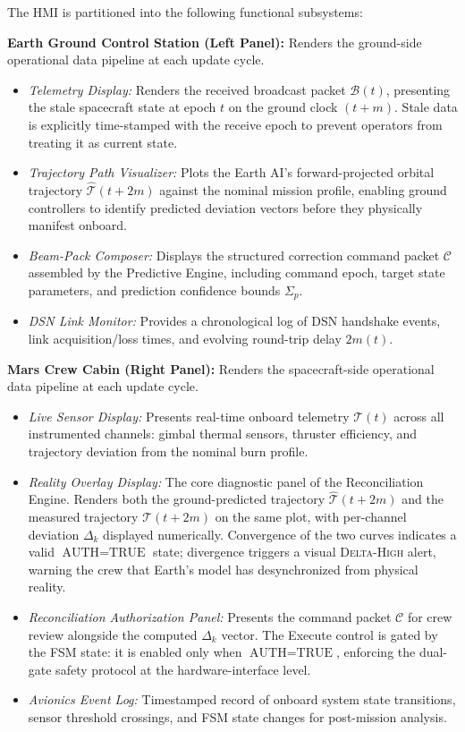 \documentclass[ASNA,twocolumn]{USG}
\begin{document}
The HMI is partitioned into the following functional subsystems:

\textbf{Earth Ground Control Station (Left Panel):} Renders the ground-side operational
data pipeline at each update cycle.
\begin{itemize}
    \item \textit{Telemetry Display:} Renders the received broadcast packet \(\mathcal{B}(t)\),
    presenting the stale spacecraft state at epoch \(t\) on the ground clock \((t+m)\).
    Stale data is explicitly time-stamped with the receive epoch to prevent operators
    from treating it as current state.
    \item \textit{Trajectory Path Visualizer:} Plots the Earth AI's forward-projected
    orbital trajectory \(\hat{\mathcal{T}}(t+2m)\) against the nominal mission profile,
    enabling ground controllers to identify predicted deviation vectors before they
    physically manifest onboard.
    \item \textit{Beam-Pack Composer:} Displays the structured correction command packet
    \(\mathcal{C}\) assembled by the Predictive Engine, including command epoch, target
    state parameters, and prediction confidence bounds \(\Sigma_p\).
    \item \textit{DSN Link Monitor:} Provides a chronological log of DSN handshake events,
    link acquisition/loss times, and evolving round-trip delay \(2m(t)\).
\end{itemize}

\textbf{Mars Crew Cabin (Right Panel):} Renders the spacecraft-side operational data pipeline
at each update cycle.
\begin{itemize}
    \item \textit{Live Sensor Display:} Presents real-time onboard telemetry \(\mathcal{T}(t)\)
    across all instrumented channels: gimbal thermal sensors, thruster efficiency, and
    trajectory deviation from the nominal burn profile.
    \item \textit{Reality Overlay Display:} The core diagnostic panel of the Reconciliation
    Engine. Renders both the ground-predicted trajectory \(\hat{\mathcal{T}}(t+2m)\) and
    the measured trajectory \(\mathcal{T}(t+2m)\) on the same plot, with per-channel
    deviation \(\Delta_k\) displayed numerically. Convergence of the two curves indicates
    a valid \(\text{AUTH} = \text{TRUE}\) state; divergence triggers a visual \textsc{Delta-High}
    alert, warning the crew that Earth's model has desynchronized from physical reality.
    \item \textit{Reconciliation Authorization Panel:} Presents the command packet
    \(\mathcal{C}\) for crew review alongside the computed \(\Delta_k\) vector.
    The Execute control is gated by the FSM state: it is enabled only when
    \(\text{AUTH} = \text{TRUE}\), enforcing the dual-gate safety protocol at the
    hardware-interface level.
    \item \textit{Avionics Event Log:} Timestamped record of onboard system state transitions,
    sensor threshold crossings, and FSM state changes for post-mission analysis.
\end{itemize}
\end{document}
